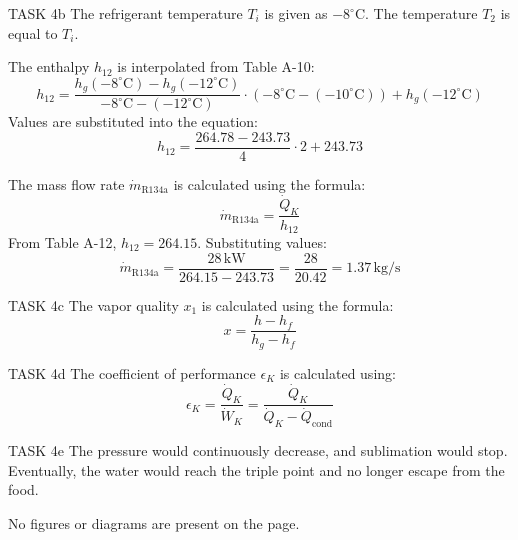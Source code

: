 TASK 4b  
The refrigerant temperature \( T_i \) is given as \( -8^\circ\text{C} \).  
The temperature \( T_2 \) is equal to \( T_i \).  

The enthalpy \( h_{12} \) is interpolated from Table A-10:  
\[
h_{12} = \frac{h_g(-8^\circ\text{C}) - h_g(-12^\circ\text{C})}{-8^\circ\text{C} - (-12^\circ\text{C})} \cdot (-8^\circ\text{C} - (-10^\circ\text{C})) + h_g(-12^\circ\text{C})
\]  
Values are substituted into the equation:  
\[
h_{12} = \frac{264.78 - 243.73}{4} \cdot 2 + 243.73
\]  

The mass flow rate \( \dot{m}_{\text{R134a}} \) is calculated using the formula:  
\[
\dot{m}_{\text{R134a}} = \frac{\dot{Q}_K}{h_{12}}
\]  
From Table A-12, \( h_{12} = 264.15 \). Substituting values:  
\[
\dot{m}_{\text{R134a}} = \frac{28 \, \text{kW}}{264.15 - 243.73} = \frac{28}{20.42} = 1.37 \, \text{kg/s}
\]  

TASK 4c  
The vapor quality \( x_1 \) is calculated using the formula:  
\[
x = \frac{h - h_f}{h_g - h_f}
\]  

TASK 4d  
The coefficient of performance \( \epsilon_K \) is calculated using:  
\[
\epsilon_K = \frac{\dot{Q}_K}{\dot{W}_K} = \frac{\dot{Q}_K}{\dot{Q}_K - \dot{Q}_{\text{cond}}}
\]  

TASK 4e  
The pressure would continuously decrease, and sublimation would stop. Eventually, the water would reach the triple point and no longer escape from the food.  

No figures or diagrams are present on the page.